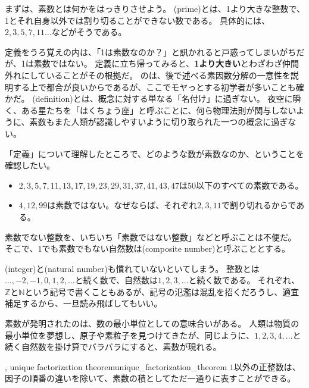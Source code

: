 まずは、素数とは何かをはっきりさせよう。
(prime)とは、1より大きな整数で、1とそれ自身以外では割り切ることができない数である。
具体的には、$2,3,5,7,11\ldots$などがそうである。

定義をうろ覚えの内は、「1は素数なのか？」と訊かれると戸惑ってしまいがちだが、1は素数ではない。
定義に立ち帰ってみると、\textbf{1より大きい}とわざわざ仲間外れにしていることがその根拠だ。
のは、後で述べる素因数分解の一意性を説明する上で都合が良いからであるが、ここでモヤっとする初学者が多いことも確かだ。
(definition)とは、概念に対する単なる「名付け」に過ぎない。
夜空に瞬く、ある星たちを「はくちょう座」と呼ぶことに、何ら物理法則が関与しないように、素数もまた人類が認識しやすいように切り取られた一つの概念に過ぎない。

「定義」について理解したところで、どのような数が素数なのか、ということを確認したい。

\begin{itemize}
 \item $2, 3, 5, 7, 11, 13, 17, 19, 23, 29, 31, 37, 41, 43, 47$は50以下のすべての素数である。
 \item $4, 12, 99$は素数ではない。なぜならば、それぞれ$2, 3, 11$で割り切れるからである。
\end{itemize}

素数でない整数を、いちいち「素数ではない整数」などと呼ぶことは不便だ。
そこで、$1$でも素数でもない自然数は(composite number)と呼ぶこととする。

(integer)と(natural number)も慣れていないといてしまう。
整数とは$\ldots,-2,-1,0,1,2,\ldots$と続く数で、自然数は$1,2,3,\ldots$と続く数である。
それぞれ、$\mathbb{Z}$と$\mathbb{N}$という記号で書くこともあるが、記号の氾濫は混乱を招くだろうし、適宜補足するから、一旦読み飛ばしてもいい。

素数が発明されたのは、数の最小単位としての意味合いがある。
人類は物質の最小単位を夢想し、原子や素粒子を見つけてきたが、同じように、$1,2,3,4,\ldots$と続く自然数を掛け算でバラバラにすると、素数が現れる。

\begin{Theo}{, unique factorization theorem}{unique_factorization_theorem}
$1$以外の正整数は、因子の順番の違いを除いて、素数の積としてただ一通りに表すことができる。
\end{Theo}

